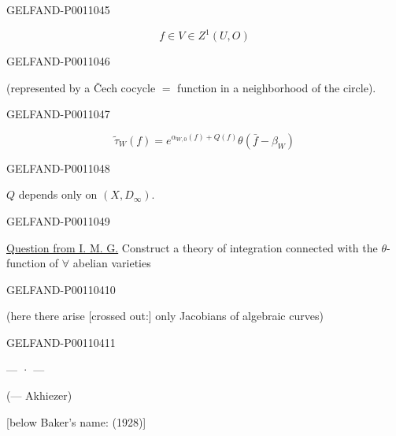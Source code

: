 \begin{GelfandAdjacentEvidence}{GELFAND-P001104}{5}


\[
f\in V\in Z^1(U,O)
\]
\end{GelfandAdjacentEvidence}
\begin{GelfandAdjacentEvidence}{GELFAND-P001104}{6}


(represented by a Čech cocycle $=$ function in a neighborhood of the circle).
\end{GelfandAdjacentEvidence}
\begin{GelfandAdjacentEvidence}{GELFAND-P001104}{7}


\[
\widetilde{\tau}_W(f)=e^{\alpha_{W,0}(f)+Q(f)}\theta(\bar f-\beta_W)
\]
\end{GelfandAdjacentEvidence}
\begin{GelfandAdjacentEvidence}{GELFAND-P001104}{8}

$Q$ depends only on $(X,D_\infty)$.
\end{GelfandAdjacentEvidence}
\begin{GelfandAdjacentEvidence}{GELFAND-P001104}{9}


\underline{Question from I. M. G.} Construct a theory of integration connected with the $\theta$-function of $\forall$ abelian varieties
\end{GelfandAdjacentEvidence}
\begin{GelfandAdjacentEvidence}{GELFAND-P001104}{10}


(here there arise [crossed out:] only Jacobians of algebraic curves)
\end{GelfandAdjacentEvidence}
\begin{GelfandAdjacentEvidence}{GELFAND-P001104}{11}


\begin{center}— · —\end{center}
 (— Akhiezer)

[below Baker’s name: (1928)]
\end{GelfandAdjacentEvidence}
